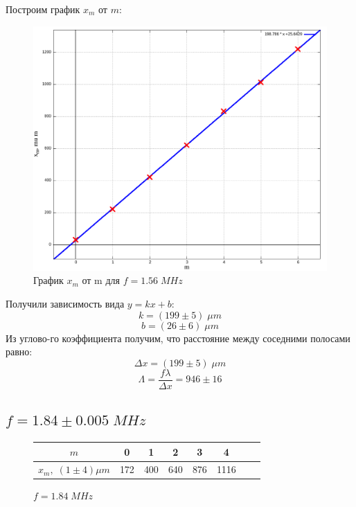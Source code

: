 \documentclass{article}
\begin{document}
Построим график \(x_m\) от \(m\):
\begin{figure}[H]
  \centering
  \includegraphics[width=\textwidth]{1560KHz.png}
  \caption{График \(x_m\) от m для \(f = 1.56\; MHz\)}
  \label{fig:1560KHz}
\end{figure}

Получили зависимость вида \(y = kx + b\):
\[ k = (199 \pm 5)\; \mu m \]
\[ b = (26 \pm 6)\; \mu m \]
Из углово-го коэффициента получим, что расстояние между соседними полосами равно:
\[ \Delta x = (199 \pm 5)\; \mu m \]
\[ \Lambda = \frac{f\lambda}{\Delta x} = 946 \pm 16 \]

\subsection*{\(f = 1.84 \pm 0.005\; MHz\)}
\begin{figure}[H]
  \centering
  \begin{tabular}{|c|c|c|c|c|c|c|c|}
    \hline
    \(m\) & 0 & 1 & 2 & 3 & 4\\\hline
    \(x_m,\; (1 \pm 4) \mu m\) & 172 & 400 & 640 & 876 & 1116 \\\hline
  \end{tabular}
  \caption{\(f = 1.84\; MHz\)}
\end{figure}
\end{document}
